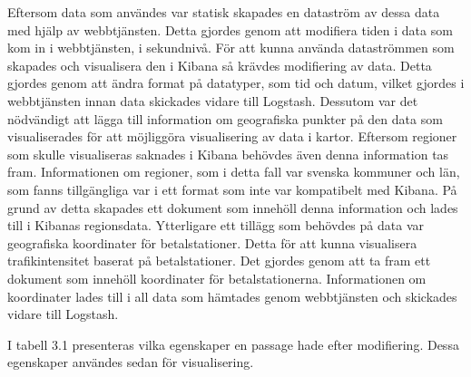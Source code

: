 \documentclass[12pt]{kththesis}
\begin{document}
Eftersom data som användes var statisk skapades en dataström av dessa data med hjälp av webbtjänsten. Detta gjordes genom att modifiera tiden i data som kom in i webbtjänsten, i sekundnivå. För att kunna använda dataströmmen som skapades och visualisera den i Kibana så krävdes modifiering av data. Detta gjordes genom att ändra format på datatyper, som tid och datum, vilket gjordes i webbtjänsten innan data skickades vidare till Logstash. Dessutom var det nödvändigt att lägga till information om geografiska punkter på den data som visualiserades för att möjliggöra visualisering av data i kartor. Eftersom regioner som skulle visualiseras saknades i Kibana behövdes även denna information tas fram. Informationen om regioner, som i detta fall var svenska kommuner och län, som fanns tillgängliga var i ett format som inte var kompatibelt med Kibana. På grund av detta skapades ett dokument som innehöll denna information och lades till i Kibanas regionsdata. Ytterligare ett tillägg som behövdes på data var geografiska koordinater för betalstationer. Detta för att kunna visualisera trafikintensitet baserat på betalstationer. Det gjordes genom att ta fram ett dokument som innehöll koordinater för betalstationerna. Informationen om koordinater lades till i all data som hämtades genom webbtjänsten och skickades vidare till Logstash. 

I tabell 3.1 presenteras vilka egenskaper en passage hade efter modifiering. Dessa egenskaper användes sedan för visualisering. 
\newpage
\captionsetup[table]{name=Tabell}
\end{document}
